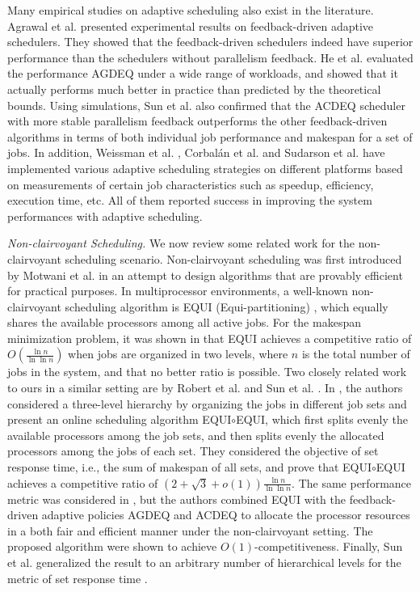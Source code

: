 \documentclass[10pt, a4paper]{article}
\begin{document}
Many empirical studies on adaptive scheduling also exist in the literature. Agrawal et al.
\cite{AgrawalHeLe06} presented experimental results on feedback-driven adaptive schedulers. They
showed that the feedback-driven schedulers indeed have superior performance than the schedulers
without parallelism feedback. He et al. \cite{HeHsLe08} evaluated the performance AGDEQ under a
wide range of workloads, and showed that it actually performs much better in practice than
predicted by the theoretical bounds. Using simulations, Sun et al. \cite{SunCaHs11} also confirmed
that the ACDEQ scheduler with more stable parallelism feedback outperforms the other
feedback-driven algorithms in terms of both individual job performance and makespan for a set of
jobs. In addition, Weissman et al. \cite{WeissmanAbEn03}, Corbal\'{a}n et al. \cite{CorbalanMaLa05}
and Sudarson et al. \cite{Sudarsan07} have implemented various adaptive scheduling strategies on
different platforms based on measurements of certain job characteristics such as speedup,
efficiency, execution time, etc. All of them reported success in improving the system performances
with adaptive scheduling.

\emph{Non-clairvoyant Scheduling.} We now review some related work for the non-clairvoyant
scheduling scenario. Non-clairvoyant scheduling was first introduced by Motwani et al.
\cite{MotwaniPhTo94} in an attempt to design algorithms that are provably efficient for practical
purposes. In multiprocessor environments, a well-known non-clairvoyant scheduling algorithm is EQUI
(Equi-partitioning) \cite{Edmonds99,EdmondsChBr03}, which equally shares the available processors
among all active jobs. For the makespan minimization problem, it was shown in \cite{RobertSc07}
that EQUI achieves a competitive ratio of $O(\frac{\ln{n}}{\ln{\ln{n}}})$ when jobs are organized
in two levels, where $n$ is the total number of jobs in the system, and that no better ratio is
possible. Two closely related work to ours in a similar setting are by Robert et al.
\cite{RobertSc07} and Sun et al. \cite{SunCaHs11-2, SunHsCa14}. In \cite{RobertSc07}, the authors considered a
three-level hierarchy by organizing the jobs in different job sets and present an online scheduling
algorithm EQUI$\circ$EQUI, which first splits evenly the available processors among the job sets,
and then splits evenly the allocated processors among the jobs of each set. They considered the
objective of set response time, i.e., the sum of makespan of all sets, and prove that
EQUI$\circ$EQUI achieves a competitive ratio of $(2+\sqrt{3}+o(1))\frac{\ln{n}}{\ln{\ln{n}}}$. The same performance metric was considered in
\cite{SunCaHs11-2}, but the authors combined EQUI with
the feedback-driven adaptive policies AGDEQ \cite{HeHsLe08} and ACDEQ \cite{SunCaHs11} to allocate the
processor resources in a both fair and efficient manner under the non-clairvoyant setting. The proposed algorithm were shown to achieve $O(1)$-competitiveness.
Finally, Sun et al. \cite{SunHsCa14} generalized the result to an arbitrary number of hierarchical levels for the metric of set response time . 
\end{document}
